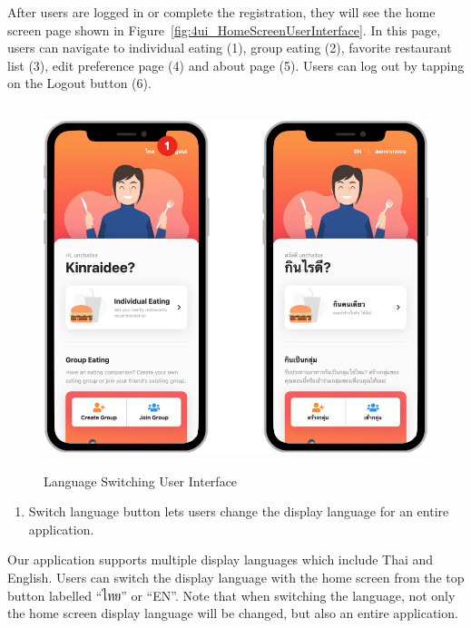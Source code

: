 \documentclass[12pt,oneside,openright,a4paper]{cpe-english-project}
\begin{document}
After users are logged in or complete the registration, they will see the home screen page shown in Figure~\ref{fig:4ui_HomeScreenUserInterface}. In this page, users can navigate to individual eating (1), group eating (2), favorite restaurant list (3), edit preference page (4) and about page (5). Users can log out by tapping on the Logout button (6).
\begin{figure}[H]\centering
\includegraphics[height=300pt]{./images/4ui_LanguageSwitchingUserInterface.png}
\caption{Language Switching User Interface}\label{fig:4ui_LanguageSwitchingUserInterface}
\end{figure}\vspace{-24pt}

\begin{enumerate}
\item Switch language button lets users change the display language for an entire application.
\end{enumerate}

Our application supports multiple display languages which include Thai and English. Users can switch the display language with the home screen from the top button labelled “ไทย” or “EN”. Note that when switching the language, not only the home screen display language will be changed, but also an entire application.

\newpage
\end{document}
